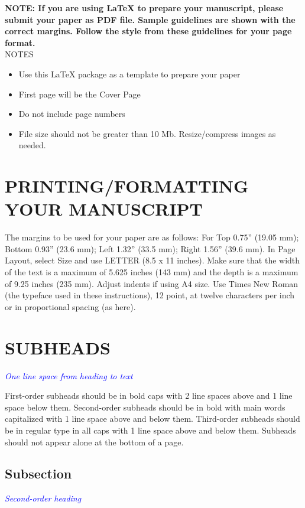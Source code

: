\documentclass[]{asc}
\begin{document}
\textbf {NOTE: If you are using LaTeX to prepare your manuscript, please submit your paper as PDF file. Sample guidelines are shown with the correct margins. Follow the style from these guidelines for your page format.}\\

NOTES
\begin{itemize}
\item Use this LaTeX package as a template to prepare your paper  
\item First page will be the Cover Page
\item Do not include page numbers
\item File size should not be greater than 10 Mb. Resize/compress images as needed.
\end{itemize}


\section*{PRINTING/FORMATTING YOUR MANUSCRIPT}

The margins to be used for your paper are as follows: For Top 0.75'' (19.05 mm); Bottom 0.93'' (23.6 mm); Left 1.32'' (33.5 mm); Right 1.56'' (39.6 mm). In Page Layout, select Size and use LETTER (8.5 x 11 inches). Make sure that the width of the text is a maximum of 5.625 inches (143 mm) and the depth is a maximum of 9.25 inches (235 mm). Adjust indents if using A4 size.
Use Times New Roman (the typeface used in these instructions), 12 point, at twelve characters per inch or in proportional spacing (as here).

\section*{SUBHEADS}\textcolor{blue}{\it One line space from heading to text} 

First-order subheads should be in bold caps with 2 line spaces above and 1 line space below them. Second-order subheads should be in bold with main words capitalized with 1 line space above and below them. Third-order subheads should be in regular type in all caps with 1 line space above and below them. Subheads should not appear alone at the bottom of a page.


\subsection*{Subsection}\textcolor{blue}{\it Second-order heading}
\end{document}
